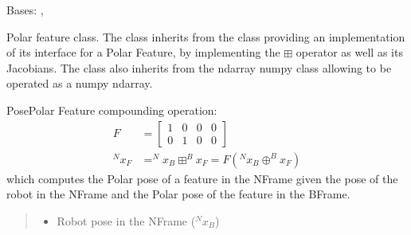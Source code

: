 \documentclass[letterpaper,10pt,english]{sphinxmanual}
\begin{document}
\begin{fulllineitems}
\label{\detokenize{Feature:Feature.PolarFeature}}
\pysigstartsignatures
{}
\pysigstopsignatures
\sphinxAtStartPar
Bases: {\hyperref[\detokenize{Feature:Feature.CartesianFeature}]{}}, 

\sphinxAtStartPar
Polar feature class. The class inherits from the {\hyperref[\detokenize{Feature:Feature.Feature}]{}} class providing an implementation of its
interface for a Polar Feature, by implementing the \(\boxplus\) operator as well as its Jacobians. The
class also inherits from the ndarray numpy class allowing to be operated as a numpy ndarray.

\begin{fulllineitems}
\label{\detokenize{Feature:Feature.PolarFeature.boxplus}}
\pysigstartsignatures
{}
\pysigstopsignatures
\sphinxAtStartPar
Pose\sphinxhyphen{}Polar Feature compounding operation:
\begin{equation}\label{equation:Feature:eq-boxplus2DCartesian}
\begin{split}F&=\begin{bmatrix} 1 & 0 & 0 & 0 \\ 0 & 1 & 0 & 0 \end{bmatrix}\\
^Nx_F&=^Nx_B \boxplus ^Bx_F = F ( ^Nx_B \oplus ^Bx_F )\end{split}
\end{equation}
\sphinxAtStartPar
which computes the Polar pose of a feature in the N\sphinxhyphen{}Frame given the pose of the robot in the N\sphinxhyphen{}Frame and the
Polar pose of the feature in the B\sphinxhyphen{}Frame.
\begin{quote}\begin{description}
\begin{itemize}
\item {} 
\sphinxAtStartPar
{} \textendash{} Robot pose in the N\sphinxhyphen{}Frame (\(^Nx_B\))


\end{itemize}
\end{description}
\end{quote}
\end{fulllineitems}
\end{fulllineitems}
\end{document}
